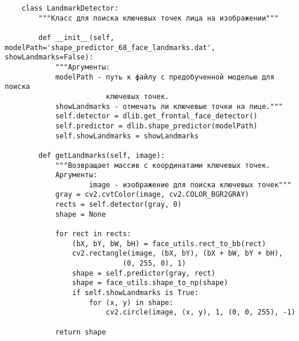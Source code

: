 \begin{verbatim}
    class LandmarkDetector:
        """Класс для поиска ключевых точек лица на изображении"""

        def __init__(self, modelPath='shape_predictor_68_face_landmarks.dat', showLandmarks=False):
            """Аргументы:
            modelPath - путь к файлу с предобученной моделью для поиска
                        ключевых точек.
            showLandmarks - отмечать ли ключевые точки на лице."""
            self.detector = dlib.get_frontal_face_detector()
            self.predictor = dlib.shape_predictor(modelPath)
            self.showLandmarks = showLandmarks

        def getLandmarks(self, image):
            """Возвращает массив с координатами ключевых точек.
            Аргументы:
                    image - изображение для поиска ключевых точек"""
            gray = cv2.cvtColor(image, cv2.COLOR_BGR2GRAY)
            rects = self.detector(gray, 0)
            shape = None

            for rect in rects:
                (bX, bY, bW, bH) = face_utils.rect_to_bb(rect)
                cv2.rectangle(image, (bX, bY), (bX + bW, bY + bH),
                            (0, 255, 0), 1)
                shape = self.predictor(gray, rect)
                shape = face_utils.shape_to_np(shape)
                if self.showLandmarks is True:
                    for (x, y) in shape:
                        cv2.circle(image, (x, y), 1, (0, 0, 255), -1)

            return shape



\end{verbatim}
